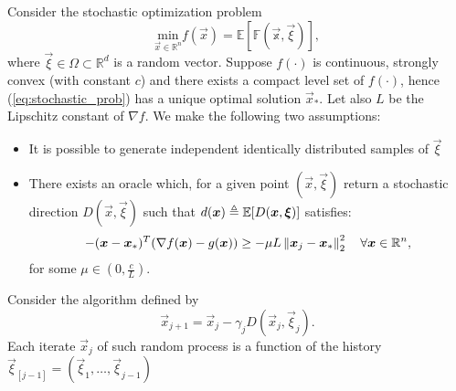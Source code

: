 Consider the stochastic optimization problem 
\begin{equation}
\underset{\vec{x} \in \mathbb{R}^n}{\text{min}} f(\vec{x}) = \mathbb{E[F(\vec{x}, \vec{\xi})]},
\label{eq:stochastic_prob}
\end{equation}
where $\vec{\xi} \in \Omega \subset \mathbb{R}^d$ is a random vector.
Suppose $f(\cdot)$ is continuous, strongly convex (with constant $c$) and there exists a compact level set of $f(\cdot)$, hence (\ref{eq:stochastic_prob}) has a unique optimal solution $\vec{x}_*$. Let also $L$ be the Lipschitz constant of $\nabla f$.
We make the following two assumptions:
\begin{itemize}
	\item	It is possible to generate independent identically distributed samples of $\vec{\xi}$
	\item There exists an oracle which, for a given point $(\vec{x}, \vec{\xi})$ return a stochastic direction $D(\vec{x}, \vec{\xi})$ such that $d(\boldsymbol{x})\triangleq\mathbb{E}[D(\boldsymbol{x}, \boldsymbol{\xi})]$ satisfies:
	\begin{equation}
	-(\boldsymbol{x}-\boldsymbol{x}_*)^T (\nabla f(\boldsymbol{x}) -g(\boldsymbol{x})) \geq -\mu L \left\Vert \boldsymbol{x}_j-\boldsymbol{x}_* \right\Vert^2_2\quad \forall \boldsymbol{x} \in \mathbb{R}^n,
	\label{eq:angular_condition}
	\end{equation}
	for some $\mu \in (0,\frac{c}{L}) $.
\end{itemize}
Consider the algorithm defined by
\begin{equation}
\vec{x}_{j+1} = \vec{x}_j -\gamma_j D(\vec{x}_j,\vec{\xi}_j).
\label{eq:stochastic_algo}
\end{equation}
Each iterate $\vec{x}_j$ of such random process is a function of the history $\vec{\xi}_{[j-1]}=(\vec{\xi}_1,\dots, \vec{\xi}_{j-1})$

